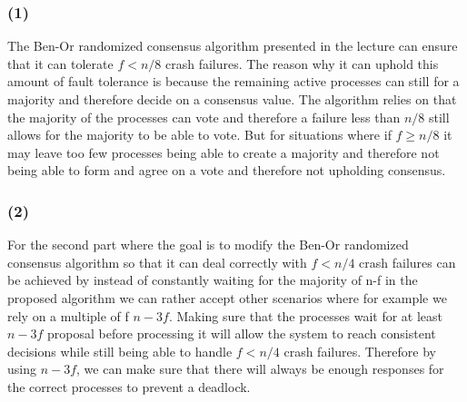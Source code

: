 \documentclass{article}
\begin{document}
\subsubsection*{(1)}
The Ben-Or randomized consensus algorithm presented in the lecture can ensure that it can tolerate $f < n/8$ crash failures. The reason why it can uphold this amount of fault tolerance is because the remaining active processes can still for a majority and therefore decide on a consensus value. The algorithm relies on that the majority of the processes can vote and therefore a failure less than $n/8$ still allows for the majority to be able to vote. But for situations where if $f \geq n/8$ it may leave too few processes being able to create a majority and therefore not being able to form and agree on a vote and therefore not upholding consensus.


\subsubsection*{(2)}
For the second part where the goal is to modify the Ben-Or randomized consensus algorithm so that it can deal correctly with $f < n/4$ crash failures can be achieved by instead of constantly waiting for the majority of n-f in the proposed algorithm we can rather accept other scenarios where for example we rely on a multiple of f $n - 3f$. Making sure that the processes wait for at least $n - 3f$ proposal before processing it will allow the system to reach consistent decisions while still being able to handle $f < n/4$ crash failures. Therefore by using $n - 3f$, we can make sure that there will always be enough responses for the correct processes to prevent a deadlock.

\newpage
\printbibliography
\end{document}
